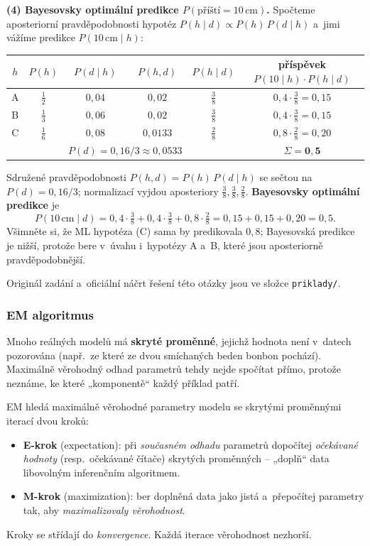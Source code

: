 \begin{priklad}
\textbf{(4) Bayesovsky optimální predikce $P(\text{příští}=10\,\text{cm})$.} Spočteme aposteriorní pravděpodobnosti hypotéz $P(h\mid d)\propto P(h)\,P(d\mid h)$ a~jimi vážíme predikce $P(10\,\text{cm}\mid h)$:
\begin{center}\small
\begin{tabular}{c|c|c|c|c|c}
\toprule
$h$ & $P(h)$ & $P(d\mid h)$ & $P(h,d)$ & $P(h\mid d)$ & příspěvek $P(10\mid h)\cdot P(h\mid d)$ \\
\midrule
A & $\tfrac12$ & $0{,}04$ & $0{,}02$    & $\tfrac38$ & $0{,}4\cdot\tfrac38 = 0{,}15$ \\
B & $\tfrac13$ & $0{,}06$ & $0{,}02$    & $\tfrac38$ & $0{,}4\cdot\tfrac38 = 0{,}15$ \\
C & $\tfrac16$ & $0{,}08$ & $0{,}0133$  & $\tfrac28$ & $0{,}8\cdot\tfrac28 = 0{,}20$ \\
\midrule
 & & \multicolumn{2}{c|}{$P(d)=0{,}16/3 \approx 0{,}0533$} & & $\Sigma = \mathbf{0{,}5}$ \\
\bottomrule
\end{tabular}
\end{center}
Sdružené pravděpodobnosti $P(h,d)=P(h)\,P(d\mid h)$ se sečtou na $P(d)=0{,}16/3$; normalizací vyjdou aposteriory $\tfrac38,\tfrac38,\tfrac28$. \textbf{Bayesovsky optimální predikce} je
\[ P(10\,\text{cm}\mid d) = 0{,}4\cdot\tfrac38 + 0{,}4\cdot\tfrac38 + 0{,}8\cdot\tfrac28 = 0{,}15+0{,}15+0{,}20 = \boxed{0{,}5}. \]
Všimněte si, že ML hypotéza (C) sama by predikovala $0{,}8$; Bayesovská predikce je nižší, protože bere v~úvahu i~hypotézy A a~B, které jsou aposteriorně pravděpodobnější.
\end{priklad}

\noindent Originál zadání a~oficiální náčrt řešení této otázky jsou ve složce \texttt{priklady/}.

\subsubsection*{EM algoritmus}

Mnoho reálných modelů má \textbf{skryté proměnné}, jejichž hodnota není v~datech pozorována (např.\ ze které ze dvou smíchaných beden bonbon pochází). Maximálně věrohodný odhad parametrů tehdy nejde spočítat přímo, protože neznáme, ke které „komponentě`` každý příklad patří.

\begin{definice}
EM hledá maximálně věrohodné parametry modelu se skrytými proměnnými iterací dvou kroků:
\begin{itemize}
  \item \textbf{E-krok} (expectation): při \emph{současném odhadu} parametrů dopočítej \emph{očekávané hodnoty} (resp.\ očekávané čítače) skrytých proměnných -- „doplň`` data libovolným inferenčním algoritmem.
  \item \textbf{M-krok} (maximization): ber doplněná data jako jistá a~přepočítej parametry tak, aby \emph{maximalizovaly věrohodnost}.
\end{itemize}
Kroky se střídají do \emph{konvergence}. Každá iterace věrohodnost nezhorší.
\end{definice}

